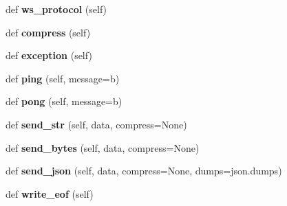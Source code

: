\begin{DoxyCompactItemize}
def {\bfseries ws\+\_\+protocol} (self)
\item 
\mbox{\label{classaiohttp_1_1web__ws_1_1_web_socket_response_af368ba57cad430f8ef525c18d07edcef}} 
def {\bfseries compress} (self)
\item 
\mbox{\label{classaiohttp_1_1web__ws_1_1_web_socket_response_ac4499d3722eb8fff00464d3bc25f06b8}} 
def {\bfseries exception} (self)
\item 
\mbox{\label{classaiohttp_1_1web__ws_1_1_web_socket_response_a1f04865e75f88e0f431bec3938688065}} 
def {\bfseries ping} (self, message=\textquotesingle{}b\textquotesingle{})
\item 
\mbox{\label{classaiohttp_1_1web__ws_1_1_web_socket_response_a8bfbe634b2b69a8d4d607e60b2f0e9f9}} 
def {\bfseries pong} (self, message=\textquotesingle{}b\textquotesingle{})
\item 
\mbox{\label{classaiohttp_1_1web__ws_1_1_web_socket_response_abc6848bb781e130901f2b6ab385aba81}} 
def {\bfseries send\+\_\+str} (self, data, compress=None)
\item 
\mbox{\label{classaiohttp_1_1web__ws_1_1_web_socket_response_af41faecd735d37e8aff53b6ba91dfb85}} 
def {\bfseries send\+\_\+bytes} (self, data, compress=None)
\item 
\mbox{\label{classaiohttp_1_1web__ws_1_1_web_socket_response_aec0bd15e639e8579c77a16cd43bb4184}} 
def {\bfseries send\+\_\+json} (self, data, compress=None, dumps=json.\+dumps)
\item 
\mbox{\label{classaiohttp_1_1web__ws_1_1_web_socket_response_a70e110042d4867a43d8f37b214c0a1ca}} 
def {\bfseries write\+\_\+eof} (self)
\item 
\mbox{\label{classaiohttp_1_1web__ws_1_1_web_socket_response_ab3bac87b1d9ccdbd1a3dd96ffd03a179}} 

\end{DoxyCompactItemize}
